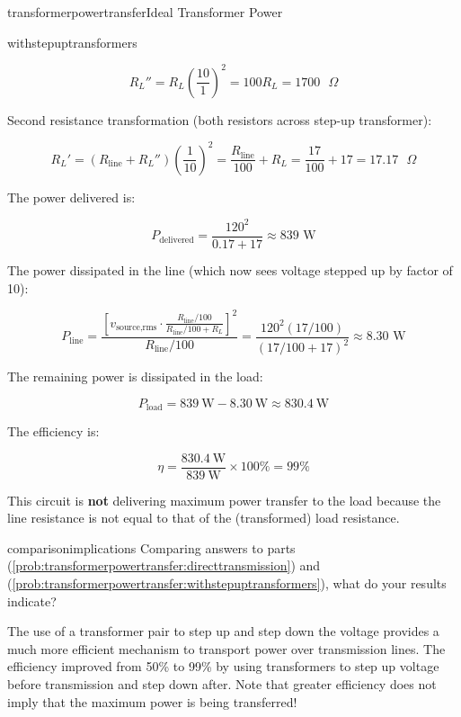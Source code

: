 \begin{mainquestion}{transformerpowertransfer}{Ideal Transformer Power}
\begin{partquestion}{withstepuptransformers}
\begin{answer}
\[
R_L'' = R_L \left(\frac{10}{1}\right)^2 = 100 R_L = 1700\text{ }\Omega
\]

Second resistance transformation (both resistors across step-up transformer):

\[
R_L' = \left(R_{\text{line}} + R_L''\right) \left(\frac{1}{10}\right)^2 = \frac{R_{\text{line}}}{100} + R_L = \frac{17}{100} + 17 = 17.17\text{ }\Omega
\]

The power delivered is:

\[
P_{\text{delivered}} = \frac{120^2}{0.17 + 17} \approx 839\text{ W}
\]

The power dissipated in the line (which now sees voltage stepped up by factor of 10):

\[
P_{\text{line}} = \frac{[v_{\text{source,rms}} \cdot \frac{R_{\text{line}}/100}{ R_{\text{line}}/100 + R_L}]^2}{R_{\text{line}}/100} = \frac{120^2(17/100)}{(17/100 + 17)^2} \approx 8.30\text{ W}
\]

The remaining power is dissipated in the load:

\[
P_{\text{load}} = \qty{839}{\watt} - \qty{8.30}{\watt} \approx \qty{830.4}{\watt}
\]

The efficiency is:

\[
\eta = \frac{\qty{830.4}{\watt}}{\qty{839}{\watt}} \times 100\% = 99\%
\]

This circuit is \textbf{not} delivering maximum power transfer to the load because the line resistance is not equal to that of the (transformed) load
resistance.
\end{answer}
\end{partquestion}

\begin{partquestion}{comparisonimplications}
{Comparing answers to parts (\cref{prob:transformerpowertransfer:directtransmission}) and (\cref{prob:transformerpowertransfer:withstepuptransformers}), what do your results indicate?}

\begin{answer}
The use of a transformer pair to step up and step down the voltage provides a much more efficient mechanism to transport power over transmission lines. The efficiency improved from 50\% to 99\% by using transformers to step up voltage before transmission and step down after. Note that greater efficiency does not imply that the maximum power is being transferred!
\end{answer}
\end{partquestion}


\end{mainquestion}
